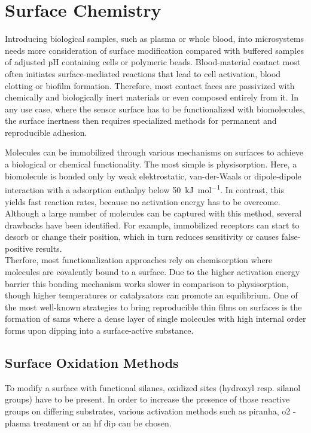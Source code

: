 \subsection{}
\clearpage
\section{Surface Chemistry}
Introducing biological samples, such as plasma or whole blood, into microsystems needs more consideration of surface modification compared with buffered samples of adjusted pH containing cells or polymeric beads. Blood-material contact most often initiates surface-mediated reactions that lead to cell activation, blood clotting or biofilm formation. Therefore, most contact faces are passivized with chemically and biologically inert materials or even composed entirely from it. In any use case, where the sensor surface has to be functionalized with biomolecules, the surface inertness then requires specialized methods for permanent and reproducible adhesion.\cite{lit:chem:surface:methods}

Molecules can be immobilized through various mechanisms on surfaces to achieve a biological or chemical functionality. The most simple is physisorption. Here, a biomolecule is bonded only by weak elektrostatic, van-der-Waals or dipole-dipole interaction with a adsorption enthalpy below \SI{50}{\kilo\joule\per\mole}. In contrast, this yields fast reaction rates, because no activation energy has to be overcome. Although a large number of molecules can be captured with this method, several drawbacks have been identified. \cite{lit:bio:ImmobilizationTechniques, lit:bio:immobilization:UV-ABs}
For example, immobilized receptors can start to desorb or change their position, which in turn reduces sensitivity or causes false-positive results. \cite{lit:bio:physisorp:desorption, lit:chem:surfModOptics} \\
Therfore, most functionalization approaches rely on chemisorption where molecules are covalently bound to a surface. Due to the higher activation energy barrier this bonding mechanism works slower in comparison to physisorption, though higher temperatures or catalysators can promote an equilibrium. One of the most well-known strategies to bring reproducible thin films on surfaces is the formation of \glspl{sam} where a dense layer of single molecules with high internal order forms upon dipping into a surface-active substance. \cite{lit:chem:sin:langeDiss}

\subsection{Surface Oxidation Methods}
To modify a surface with functional silanes, oxidized sites (\gls{hydroxyl} resp. \gls{silanol} groups) have to be present. In order to increase the presence of those reactive groups on differing substrates, various activation methods such as piranha, \gls{o2} - plasma treatment or an \gls{hf} dip can be chosen. \cite{lit:chem:sin:etchingandchemical} 

